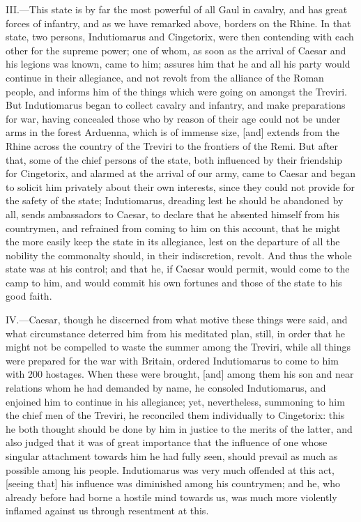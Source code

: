III.—This state is by far the most powerful of all Gaul in cavalry, and
has great forces of infantry, and as we have remarked above, borders on
the Rhine. In that state, two persons, Indutiomarus and Cingetorix, were
then contending with each other for the supreme power; one of whom, as
soon as the arrival of Caesar and his legions was known, came to him;
assures him that he and all his party would continue in their
allegiance, and not revolt from the alliance of the Roman people, and
informs him of the things which were going on amongst the Treviri. But
Indutiomarus began to collect cavalry and infantry, and make
preparations for war, having concealed those who by reason of their age
could not be under arms in the forest Arduenna, which is of immense
size, [and] extends from the Rhine across the country of the Treviri to
the frontiers of the Remi. But after that, some of the chief persons of
the state, both influenced by their friendship for Cingetorix, and
alarmed at the arrival of our army, came to Caesar and began to solicit
him privately about their own interests, since they could not provide
for the safety of the state; Indutiomarus, dreading lest he should be
abandoned by all, sends ambassadors to Caesar, to declare that he
absented himself from his countrymen, and refrained from coming to him
on this account, that he might the more easily keep the state in its
allegiance, lest on the departure of all the nobility the commonalty
should, in their indiscretion, revolt. And thus the whole state was at
his control; and that he, if Caesar would permit, would come to the camp
to him, and would commit his own fortunes and those of the state to his
good faith.

IV.—Caesar, though he discerned from what motive these things were
said, and what circumstance deterred him from his meditated plan, still,
in order that he might not be compelled to waste the summer among the
Treviri, while all things were prepared for the war with Britain,
ordered Indutiomarus to come to him with 200 hostages. When these were
brought, [and] among them his son and near relations whom he had
demanded by name, he consoled Indutiomarus, and enjoined him to continue
in his allegiance; yet, nevertheless, summoning to him the chief men of
the Treviri, he reconciled them individually to Cingetorix: this he both
thought should be done by him in justice to the merits of the latter,
and also judged that it was of great importance that the influence of
one whose singular attachment towards him he had fully seen, should
prevail as much as possible among his people. Indutiomarus was very much
offended at this act, [seeing that] his influence was diminished among
his countrymen; and he, who already before had borne a hostile mind
towards us, was much more violently inflamed against us through
resentment at this.

